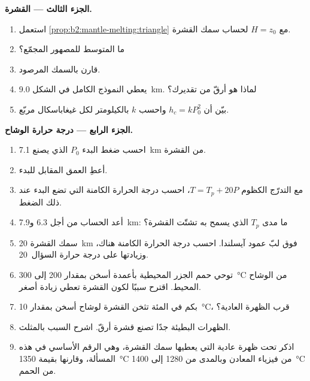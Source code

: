 \begin{problem}
\noindent\textbf{الجزء الثالث --- القشرة.}
\begin{enumerate}[resume]
\item استعمل \cref{prop:b2:mantle-melting:triangle} مع $H = z_0$ لحساب
سمك القشرة.
\item ما  المتوسط للمصهور المجمّع؟
\item قارن بالسمك المرصود.
\item يعطي النموذج الكامل في الشكل \qty{9.0}{km}. لماذا هو أرقّ من
تقديرك؟
\item بيّن أن $h_c = k P_0^2$ واحسب $k$ بالكيلومتر لكل غيغاباسكال
مربّع.
\end{enumerate}

\noindent\textbf{الجزء الرابع --- درجة حرارة الوشاح.}
\begin{enumerate}[resume]
\item احسب ضغط البدء $P_0$ الذي يصنع \qty{7.1}{km} من القشرة.
\item أعطِ العمق المقابل للبدء.
\item مع التدرّج الكظوم $T = T_p + 20P$، احسب درجة الحرارة الكامنة التي
تضع البدء عند ذلك الضغط.
\item أعد الحساب من أجل 6.3 و\qty{7.9}{km}: ما مدى $T_p$ الذي يسمح به
تشتّت القشرة؟
\item سمك القشرة \qty{20}{km} فوق لبّ عمود آيسلندا. احسب
درجة الحرارة الكامنة هناك، وزيادتها على درجة حرارة السؤال~20.
\item توحي حمم الجزر المحيطية بأعمدة أسخن بمقدار 200 إلى \qty{300}{\celsius} من
الوشاح المحيط. اقترح سببًا لكون القشرة تعطي زيادة أصغر.
\item بكم في المئة تثخن القشرة لوشاح أسخن بمقدار \qty{10}{\celsius}،
قرب الظهرة العادية؟
\item الظهرات البطيئة جدًا تصنع قشرة أرقّ. اشرح السبب بالمثلث.
\item اذكر  تحت ظهرة عادية التي
يعطيها سمك القشرة، وهي الرقم الأساسي في هذه المسألة، وقارنها
بقيمة \qty{1350}{\celsius} من فيزياء المعادن وبالمدى من 1280 إلى
\qty{1400}{\celsius} من الحمم.
\end{enumerate}
\end{problem}
